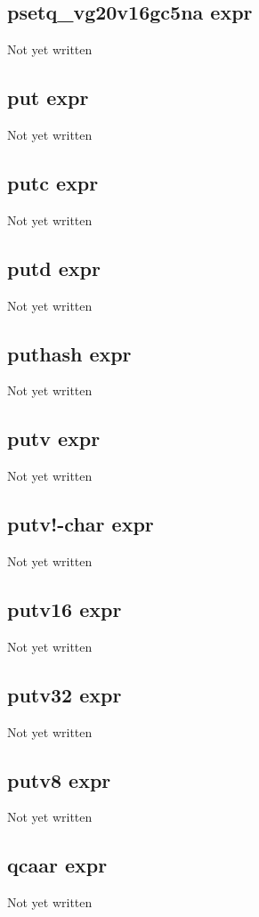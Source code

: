 \documentclass[a4paper,11pt]{article}
\begin{document}
\subsection{\ttfamily psetq\_vg20v16gc5na expr}
Not yet written

\subsection{\ttfamily put expr}
Not yet written

\subsection{\ttfamily putc expr}
Not yet written

\subsection{\ttfamily putd expr}
Not yet written

\subsection{\ttfamily puthash expr}
Not yet written

\subsection{\ttfamily putv expr}
Not yet written

\subsection{\ttfamily putv!-char expr}
Not yet written

\subsection{\ttfamily putv16 expr}
Not yet written

\subsection{\ttfamily putv32 expr}
Not yet written

\subsection{\ttfamily putv8 expr}
Not yet written

\subsection{\ttfamily qcaar expr}
Not yet written
\end{document}

